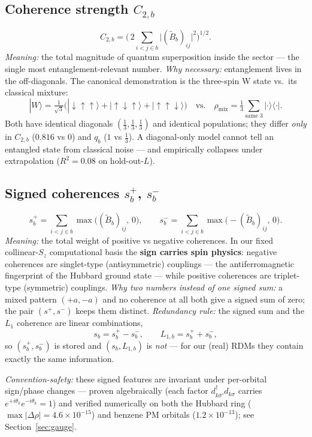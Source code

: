\documentclass[11pt]{article}
\newcommand{\Bt}{\ensuremath{\widetilde B_b}}
\begin{document}
\subsection{Coherence strength $C_{2,b}$}
\[
  C_{2,b}=\Big(\,2\!\!\sum_{i<j\in b}\!\big|(\Bt)_{ij}\big|^2\Big)^{1/2}.
\]
\emph{Meaning:} the total magnitude of quantum superposition inside the
sector --- the single most entanglement-relevant number. \emph{Why
necessary:} entanglement lives in the off-diagonals. The canonical
demonstration is the three-spin W state vs.\ its classical mixture:
\[
  |W\rangle=\tfrac{1}{\sqrt3}\big(|{\downarrow\uparrow\uparrow}\rangle
  +|{\uparrow\downarrow\uparrow}\rangle
  +|{\uparrow\uparrow\downarrow}\rangle\big)
  \quad\text{vs.}\quad
  \rho_{\mathrm{mix}}=\tfrac13\!\sum_{\text{same 3}}|{\cdot}\rangle\langle{\cdot}| .
\]
Both have identical diagonals $(\tfrac13,\tfrac13,\tfrac13)$ and identical
populations; they differ \emph{only} in $C_{2,b}$ ($0.816$ vs $0$) and $q_b$
($1$ vs $\tfrac13$). A diagonal-only model cannot tell an entangled state
from classical noise --- and empirically collapses under extrapolation
($R^2=0.08$ on hold-out-$L$).

\subsection{Signed coherences $s^{+}_b$, $s^{-}_b$}
\[
  s^{+}_b=\sum_{i<j\in b}\max\!\big((\Bt)_{ij},\,0\big),
  \qquad
  s^{-}_b=\sum_{i<j\in b}\max\!\big(-(\Bt)_{ij},\,0\big).
\]
\emph{Meaning:} the total weight of positive vs negative coherences. In our
fixed collinear-$S_z$ computational basis the \textbf{sign carries spin
physics}: negative coherences are singlet-type (antisymmetric) couplings ---
the antiferromagnetic fingerprint of the Hubbard ground state --- while
positive coherences are triplet-type (symmetric) couplings. \emph{Why two
numbers instead of one signed sum:} a mixed pattern $(+a,-a)$ and no
coherence at all both give a signed sum of zero; the pair
$(s^{+},s^{-})$ keeps them distinct. \emph{Redundancy rule:} the signed sum
and the $L_1$ coherence are linear combinations,
\[
  s_b=s^{+}_b-s^{-}_b,\qquad L_{1,b}=s^{+}_b+s^{-}_b ,
\]
so $(s^{+}_b,s^{-}_b)$ is stored and $(s_b,L_{1,b})$ is \emph{not} --- for
our (real) RDMs they contain exactly the same information.

\emph{Convention-safety:} these signed features are invariant under
per-orbital sign/phase changes --- proven algebraically (each factor
$d^{\dagger}_{k\sigma'}d_{k\sigma}$ carries $e^{+i\theta_k}e^{-i\theta_k}=1$)
and verified numerically on both the Hubbard ring
($\max|\Delta\rho|=4.6\times10^{-15}$) and benzene PM orbitals
($1.2\times10^{-13}$); see Section~\ref{sec:gauge}.
\end{document}
